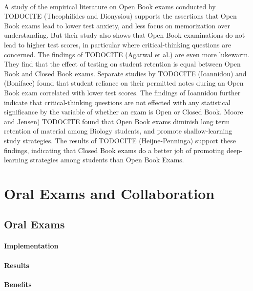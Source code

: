 \documentclass[12pt]{article}
\begin{document}
\paragraph{}
A study of the empirical literature on Open Book exams conducted by TODOCITE (Theophilides and Dionysiou) supports the assertions that Open Book exams lead to lower test anxiety, and less focus on memorization over understanding. But their study also shows that Open Book examinations do not lead to higher test scores, in particular where critical-thinking questions are concerned. The findings of TODOCITE (Agarwal et al.) are even more lukewarm. They find that the effect of testing on student retention is equal between Open Book and Closed Book exams. Separate studies by TODOCITE (Ioannidou) and (Boniface) found that student reliance on their permitted notes during an Open Book exam correlated with lower test scores. The findings of Ioannidou further indicate that critical-thinking questions are not effected with any statistical significance by the variable of whether an exam is Open or Closed Book. Moore and Jensen) TODOCITE found that Open Book exams diminish long term retention of material among Biology students, and promote shallow-learning study strategies. The results of TODOCITE (Heijne-Penninga) support these findings, indicating that Closed Book exams do a better job of promoting deep-learning strategies among students than Open Book Exams.
\paragraph{}


\section{Oral Exams and Collaboration}\label{sec:communication}
\subsection{Oral Exams}\label{subsec:oral}
\paragraph{Implementation}
\paragraph{Results}
\paragraph{Benefits}
\end{document}
